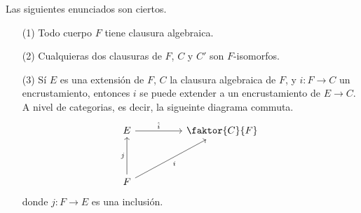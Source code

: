 \begin{theorem}\label{theorem_87}
    Las siguientes enunciados son ciertos.
    \begin{enumerate}
        \item[(1)] Todo cuerpo $F$ tiene clausura algebraica.

        \item[(2)] Cualquieras dos clausuras de $F$,  $C$ y  $C'$ son
            $F$-isomorfos.

        \item[(3)] S\'i $E$ es una extensi\'on de  $F$, $C$ la clausura
            algebraica de $F$, y $i:F \xrightarrow{} C$ un encrustamiento,
            entonces $i$ se puede extender a un encrustamiento de  $E
            \xrightarrow{} C$. A nivel de categorias, es decir, la sigueinte
            diagrama commuta.
            \[\begin{tikzcd}
                E && {\faktor{C}{F}} \\
                \\
                F
                \arrow["{\hat{i}}", from=1-1, to=1-3]
                \arrow["i"', from=3-1, to=1-3]
                \arrow["j", from=3-1, to=1-1]
            \end{tikzcd}\]
            donde $j:F \xrightarrow{} E$ es una inclusi\'on.
    \end{enumerate}
\end{theorem}

